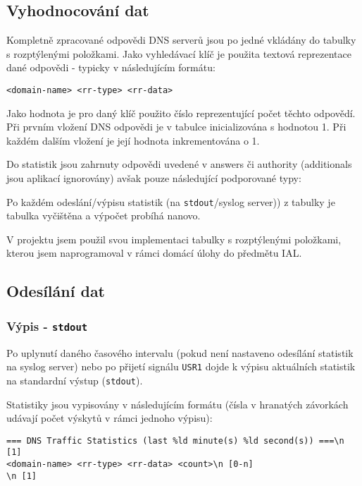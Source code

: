 \documentclass[11pt]{article}
\begin{document}
	\subsection{Vyhodnocování dat}
	Kompletně zpracované odpovědi DNS serverů jsou po jedné vkládány do tabulky s rozptýlenými položkami. Jako vyhledávací klíč je použita textová reprezentace dané odpovědi - typicky v následujícím formátu:
	
	\begin{verbatim}
<domain-name> <rr-type> <rr-data>
	\end{verbatim}
	
	Jako hodnota je pro daný klíč použito číslo reprezentující počet těchto odpovědí. Při prvním vložení DNS odpovědi je v tabulce inicializována s hodnotou 1. Při každém dalším vložení je její hodnota inkrementována o 1.
	
	Do statistik jsou zahrnuty odpovědi uvedené v answers či authority (additionals jsou aplikací ignorovány) avšak pouze následující podporované typy:
	
	
	Po každém odeslání/výpisu statistik (na \texttt{stdout}/syslog server)) z tabulky je tabulka vyčištěna a výpočet probíhá nanovo.
	
	V projektu jsem použil svou implementaci tabulky s rozptýlenými položkami, kterou jsem naprogramoval v rámci domácí úlohy do předmětu IAL.
	
	
	\subsection{Odesílání dat} \label{section:data-sending}
	\subsubsection{Výpis - \texttt{stdout}}
	Po uplynutí daného časového intervalu (pokud není nastaveno odesílání statistik na syslog server) nebo po přijetí signálu \texttt{USR1} dojde k výpisu aktuálních statistik na standardní výstup (\texttt{stdout}).
	
	Statistiky jsou vypisovány v následujícím formátu (čísla v hranatých závorkách udávají počet výskytů v rámci jednoho výpisu):
	\begin{verbatim}
=== DNS Traffic Statistics (last %ld minute(s) %ld second(s)) ===\n [1]
<domain-name> <rr-type> <rr-data> <count>\n [0-n]
\n [1]
	\end{verbatim}
	
\end{document}
